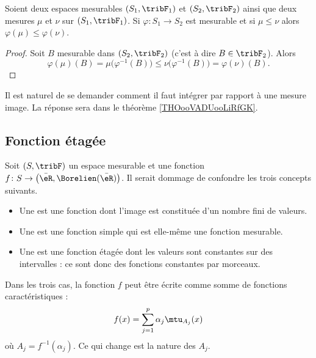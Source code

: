\begin{lemma}
    Soient deux espaces mesurables \( (S_1,\tribF_1)\) et \( (S_2,\tribF_2)\) ainsi que deux mesures \( \mu\) et \( \nu\) sur \( (S_1,\tribF_1)\). Si \( \varphi\colon S_1\to S_2\) est mesurable et si \( \mu\leq \nu\) alors \( \varphi(\mu)\leq \varphi(\nu)\).
\end{lemma}

\begin{proof}
    Soit \( B\) mesurable dans \( (S_2,\tribF_2)\) (c'est à dire \( B\in \tribF_2\)). Alors
    \begin{equation}
        \varphi(\mu)(B)=\mu\big( \varphi^{-1}(B) \big)\leq\nu\big( \varphi^{-1}(B) \big)=\varphi(\nu)(B).
    \end{equation}
\end{proof}

Il est naturel de se demander comment il faut intégrer par rapport à une mesure image. La réponse sera dans le théorème \ref{THOooVADUooLiRfGK}.

\subsection{Fonction étagée}

\begin{definition}\label{DefBPCxdel}
    Soit \( (S,\tribF)\) un espace mesurable et une fonction \( f\colon S\to \big( \bar\eR,\Borelien(\bar\eR) \big)\). Il serait dommage de confondre les trois concepts suivants.
    \begin{itemize}
        \item
    Une  est une fonction dont l'image est constituée d'un nombre fini de valeurs.
\item
    Une  est une fonction simple qui est elle-même une fonction mesurable.
\item
    Une  est une fonction étagée dont les valeurs sont constantes sur des intervalles : ce sont donc des fonctions constantes par morceaux.
    \end{itemize}
\end{definition}

Dans les trois cas, la fonction \( f\) peut être écrite comme somme de fonctions caractéristiques :
\begin{equation}
    f(x)=\sum_{j=1}^p\alpha_j\mtu_{A_j}(x)
\end{equation}
où \( A_j=f^{-1}(\alpha_j)\). Ce qui change est la nature des \( A_j\).

